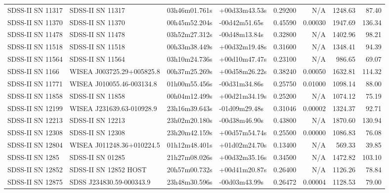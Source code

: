 \begin{longtable}{llllrrrr}
SDSS-II SN 11317 &                SDSS-II SN 11317 &   03h46m01.761s &   +00d33m43.53s &  0.29200 &      N/A &  1248.63 &       87.40 \\
SDSS-II SN 11370 &                SDSS-II SN 11370 &   00h45m52.204s &   -00d42m51.65s &  0.45590 &  0.00030 &  1947.69 &      136.34 \\
SDSS-II SN 11478 &                SDSS-II SN 11478 &   03h52m27.312s &   -00d48m13.84s &  0.32800 &      N/A &  1402.96 &       98.21 \\
SDSS-II SN 11518 &                SDSS-II SN 11518 &   00h33m38.449s &   +00d32m19.48s &  0.31600 &      N/A &  1348.41 &       94.39 \\
SDSS-II SN 11564 &                SDSS-II SN 11564 &   03h10m24.736s &   +00d10m47.47s &  0.23100 &      N/A &   986.65 &       69.07 \\
SDSS-II SN 1166  &       WISEA J003725.29+005825.8 &   00h37m25.269s &   +00d58m26.22s &  0.38240 &  0.00050 &  1632.81 &      114.32 \\
SDSS-II SN 11771 &       WISEA J010055.46-003134.8 &   01h00m55.456s &   -00d31m34.86s &  0.25750 &  0.01000 &  1098.14 &       88.00 \\
SDSS-II SN 11858 &                SDSS-II SN 11858 &   00h04m12.499s &   +00d21m34.19s &  0.25200 &      N/A &  1074.12 &       75.19 \\
SDSS-II SN 12199 &       WISEA J231639.63-010928.9 &   23h16m39.643s &   -01d09m29.48s &  0.31046 &  0.00002 &  1324.37 &       92.71 \\
SDSS-II SN 12213 &                SDSS-II SN 12213 &   23h02m20.180s &   -00d38m46.90s &  0.43800 &      N/A &  1870.60 &      130.94 \\
SDSS-II SN 12308 &                SDSS-II SN 12308 &   23h20m42.159s &   +00d57m54.74s &  0.25500 &  0.00000 &  1086.83 &       76.08 \\
SDSS-II SN 12804 &       WISEA J011248.36+010224.5 &   01h12m48.401s &   +01d02m24.70s &  0.13400 &      N/A &   569.33 &       39.85 \\
SDSS-II SN 1285  &                SDSS-II SN 01285 &   21h27m08.026s &   +00d32m35.16s &  0.34500 &      N/A &  1472.82 &      103.10 \\
SDSS-II SN 12852 &           SDSS-II SN 12852 HOST &   20h57m00.732s &   +00d41m20.87s &  0.26400 &      N/A &  1126.26 &       78.84 \\
SDSS-II SN 12875 &        SDSS J234830.59-000343.9 &   23h48m30.596s &   -00d03m43.99s &  0.26472 &  0.00004 &  1128.53 &       79.00 \\

\end{longtable}
